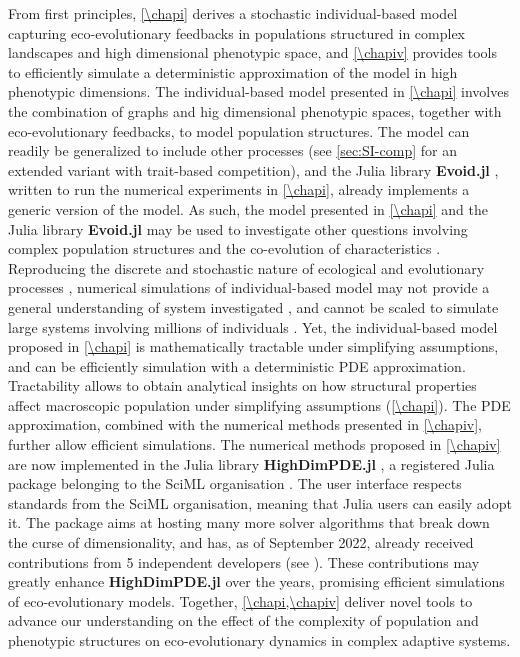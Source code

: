 From first principles, \cref{\chapi} derives a stochastic individual-based model capturing eco-evolutionary feedbacks in populations structured in complex landscapes and high dimensional phenotypic space, and \cref{\chapiv} provides tools to efficiently simulate a deterministic approximation of the model in high phenotypic dimensions.
% 
The individual-based model presented in \cref{\chapi} involves the combination of graphs and hig dimensional phenotypic spaces, together with eco-evolutionary feedbacks, to model population structures. The model can readily be generalized to include other processes (see \cref{sec:SI-comp} for an extended variant with trait-based competition), and the Julia library \textbf{Evoid.jl} \cite{Evoid.jl}, written to run the numerical experiments in \cref{\chapi}, already implements a generic version of the model. %
% 
As such, the model presented in \cref{\chapi} and the Julia library \textbf{Evoid.jl} may be used to investigate other questions involving complex population structures \cite{LiebermanHauert2005} and the co-evolution of characteristics \citep{Doebeli2011}.
% 
Reproducing the discrete and stochastic nature of ecological and evolutionary processes \citep{Champagnat2006}, numerical simulations of individual-based model may not provide a general understanding of system investigated \citep{Lyon2016}, and cannot be scaled to simulate large systems involving millions of individuals \cite{deangelis2005individual}. Yet, the individual-based model proposed in \cref{\chapi} is mathematically tractable under simplifying assumptions, and can be efficiently simulation with a deterministic PDE approximation.
% 
Tractability allows to obtain analytical insights on how structural properties affect macroscopic population under simplifying assumptions (\cref{\chapi}).
% 
The PDE approximation, combined with the numerical methods presented in \cref{\chapiv}, further allow efficient simulations. 
% 
The numerical methods proposed in \cref{\chapiv} are now implemented in the Julia library \textbf{HighDimPDE.jl} \citep{HighDimPDE}, a registered Julia package belonging to the SciML organisation \citep{SciML}.
The user interface respects standards from the SciML organisation, meaning that Julia users can easily adopt it.
%
The package aims at hosting many more solver algorithms that break down the curse of dimensionality, and has, as of September 2022, already received contributions from 5 independent developers (see \cite{https://github.com/SciML/HighDimPDE.jl/graphs/contributors}). These contributions may greatly enhance \textbf{HighDimPDE.jl} over the years, promising efficient simulations of eco-evolutionary models.
% 
% 
Together, \cref{\chapi,\chapiv} deliver novel tools to advance our understanding on the effect of the complexity of population and phenotypic structures on eco-evolutionary dynamics in complex adaptive systems.


